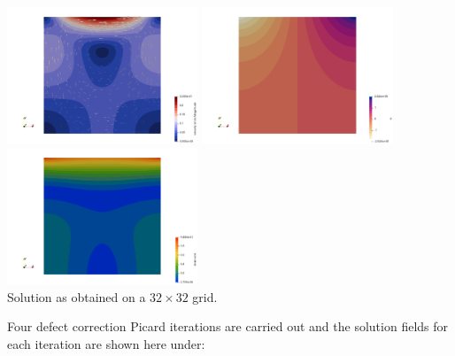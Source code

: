 \begin{center}
\includegraphics[width=5.7cm]{python_codes/fieldstone_87/results/experiment_00/vel}
\includegraphics[width=5.7cm]{python_codes/fieldstone_87/results/experiment_00/p}
\includegraphics[width=5.7cm]{python_codes/fieldstone_87/results/experiment_00/sr}\\
{\captionfont Solution as obtained on a $32\times 32$ grid.}
\end{center}

Four defect correction Picard iterations are carried out and the solution fields for 
each iteration are shown here under:  


